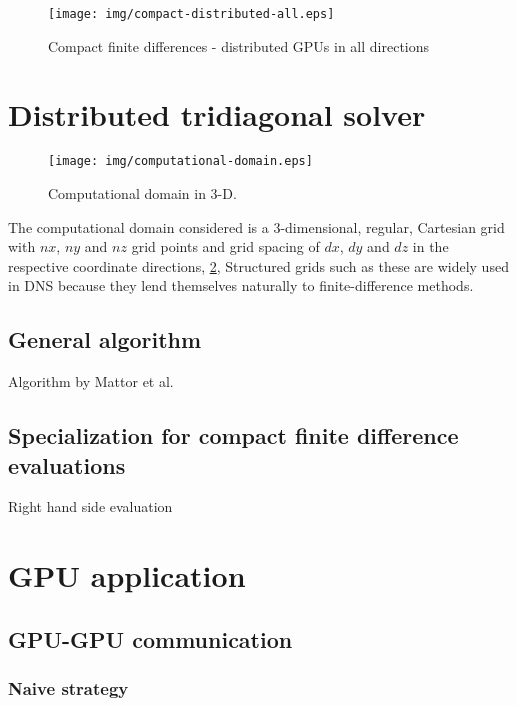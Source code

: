 \begin{figure}
\begin{center}
\texttt{[image: img/compact-distributed-all.eps]}
\caption{Compact finite differences - distributed GPUs in all
    directions}
\label{fig:compact-distributed-all}
\end{center}
\end{figure}

\section{Distributed tridiagonal solver}

\begin{figure}
\begin{center}
\texttt{[image: img/computational-domain.eps]}
\caption{Computational domain in 3-D.}
\label{fig:computational-domain}
\end{center}
\end{figure}
%
The computational domain considered
is a 3-dimensional,
regular, Cartesian grid with
$nx$, $ny$ and $nz$ grid points and grid spacing of
$dx$, $dy$ and $dz$ in the
respective coordinate directions,
\ref{fig:computational-domain},
Structured grids such as these
are widely used in DNS because they lend themselves naturally
to finite-difference methods.



    \subsection{General algorithm}

    Algorithm by Mattor et al.

    \subsection{Specialization for compact finite difference
        evaluations}

    Right hand side evaluation
    

\section{GPU application}

    \subsection{GPU-GPU communication}
        \subsubsection{Naive strategy}
        
